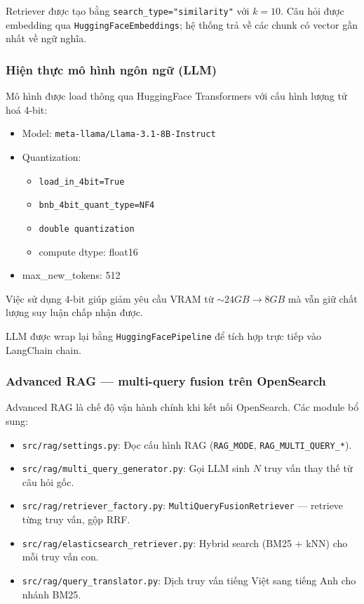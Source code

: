 Retriever được tạo bằng \texttt{search\_type="similarity"} với $k = 10$. Câu hỏi được embedding qua \texttt{HuggingFaceEmbeddings}; hệ thống trả về các chunk có vector gần nhất về ngữ nghĩa.

\subsubsection{Hiện thực mô hình ngôn ngữ (LLM)}

Mô hình được load thông qua HuggingFace Transformers với cấu hình lượng tử hoá 4-bit:

\begin{itemize}
    \item Model: \texttt{meta-llama/Llama-3.1-8B-Instruct}
    \item Quantization:
    \begin{itemize}
        \item \texttt{load\_in\_4bit=True}
        \item \texttt{bnb\_4bit\_quant\_type=NF4}
        \item \texttt{double quantization}
        \item compute dtype: float16
    \end{itemize}
    \item max\_new\_tokens: 512
\end{itemize}

Việc sử dụng 4-bit giúp giảm yêu cầu VRAM từ $\sim 24GB \rightarrow 8GB$ mà vẫn giữ chất lượng suy luận chấp nhận được.

LLM được wrap lại bằng \texttt{HuggingFacePipeline} để tích hợp trực tiếp vào LangChain chain.
\subsubsection{Advanced RAG --- multi-query fusion trên OpenSearch}

Advanced RAG là chế độ vận hành chính khi kết nối OpenSearch. Các module bổ sung:

\begin{itemize}
    \item \texttt{src/rag/settings.py}: Đọc cấu hình RAG (\texttt{RAG\_MODE}, \texttt{RAG\_MULTI\_QUERY\_*}).
    \item \texttt{src/rag/multi\_query\_generator.py}: Gọi LLM sinh $N$ truy vấn thay thế từ câu hỏi gốc.
    \item \texttt{src/rag/retriever\_factory.py}: \texttt{MultiQueryFusionRetriever} --- retrieve từng truy vấn, gộp RRF.
    \item \texttt{src/rag/elasticsearch\_retriever.py}: Hybrid search (BM25 + kNN) cho mỗi truy vấn con.
    \item \texttt{src/rag/query\_translator.py}: Dịch truy vấn tiếng Việt sang tiếng Anh cho nhánh BM25.
\end{itemize}

